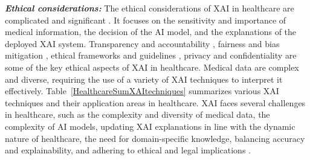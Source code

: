 \documentclass[final,5p,times,twocolumn]{elsarticle}
\begin{document}
\textbf{ \textit{Ethical considerations:}} The ethical considerations of XAI in healthcare are complicated and significant \cite{amann2020explainability, chaddad2023survey}. It focuses on the sensitivity and importance of medical information, the decision of the AI model, and the explanations of the deployed XAI system. Transparency and accountability \cite{albahri2023systematic}, fairness and bias mitigation \cite{amann2020explainability}, ethical frameworks and guidelines \cite{kerasidou2021ethics}, privacy and confidentiality \cite{aranovich2023ensuring} are some of the key ethical aspects of XAI in healthcare.
Medical data are complex and diverse, requiring the use of a variety of XAI techniques to interpret it effectively. 
Table~\ref{HealthcareSumXAItechniques} summarizes various XAI techniques and their application areas in healthcare. XAI faces several challenges in healthcare, such as the complexity and diversity of medical data, the complexity of AI models, updating XAI explanations in line with the dynamic nature of healthcare, the need for domain-specific knowledge, balancing accuracy and explainability, and adhering to ethical and legal implications \cite{anton2022comprehensive, alam2023explainable}.

        
        
\end{document}
